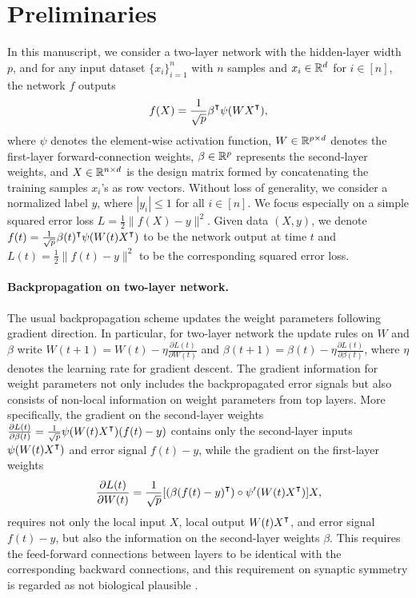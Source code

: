 \section{Preliminaries}

In this manuscript, we consider a two-layer network with the hidden-layer width $p$, and for any input dataset $\{x_i\}_{i=1}^n$ with $n$ samples and $x_i\in{\mathbb{R}^{d}}$ for $i\in[n]$, the network $f$ outputs 
\begin{align}\label{eqn:nonlinear-network}
    f(X) = \frac{1}{\sqrt p}\beta\transpose\psi(WX\transpose),
\end{align}
where $\psi$ denotes the element-wise activation function, $W\in{\mathbb{R}^{p\times d}}$ denotes the first-layer forward-connection weights, $\beta\in{\mathbb{R}^{p}}$ represents the second-layer weights, and $X\in{\mathbb{R}^{n\times d}}$ is the design matrix formed by concatenating the training samples $x_i$'s as row vectors. 
Without loss of generality, we consider a normalized label $y$, where $|y_i|\leq 1$ for all $i\in[n]$.
We focus especially on a simple squared error loss $L = \frac{1}{2}\|f(X)-y\|^2$. Given data $(X,y)$, we denote $f(t) = \frac{1}{\sqrt p}\beta(t)\transpose\psi(W(t)X\transpose)$ to be the network output at time $t$ and $L(t) = \frac{1}{2}\|f(t)-y\|^2$ to be the corresponding squared error loss.

\paragraph{Backpropagation on two-layer network.}

The usual backpropagation scheme updates the weight parameters following gradient direction. In particular, for two-layer network the update rules on $W$ and $\beta$ write $W(t+1) = W(t) - \eta \frac{\partial L(t)}{\partial W(t)}$ and $\beta(t+1) = \beta(t) - \eta \frac{\partial L(t)}{\partial \beta(t)}$, where $\eta$ denotes the learning rate for gradient descent. The gradient information for weight parameters not only includes the backpropagated error signals but also consists of non-local information on weight parameters from top layers. More specifically, the gradient on the second-layer weights $\frac{\partial L(t)}{\partial \beta(t)} = \frac{1}{\sqrt{p}} \psi(W(t) X\transpose) (f(t) - y)$ contains only the second-layer inputs $\psi(W(t) X\transpose)$ and error signal $f(t) - y$, while the gradient on the first-layer weights 
\begin{align}\label{eqn:backprop-gradient}
    \frac{\partial L(t)}{\partial W(t)} = \frac{1}{\sqrt{p}} [(\beta (f(t) - y)\transpose)\circ \psi'(W(t)X\transpose)] X,
\end{align}
requires not only the local input $X$, local output $W(t)X\transpose$, and error signal $f(t) - y$, but also the information on the second-layer weights $\beta$.
This requires the feed-forward connections between layers to be identical with the corresponding backward connections, and this requirement on synaptic symmetry is regarded as not biological plausible \citep{lillicrap2016random}. 

